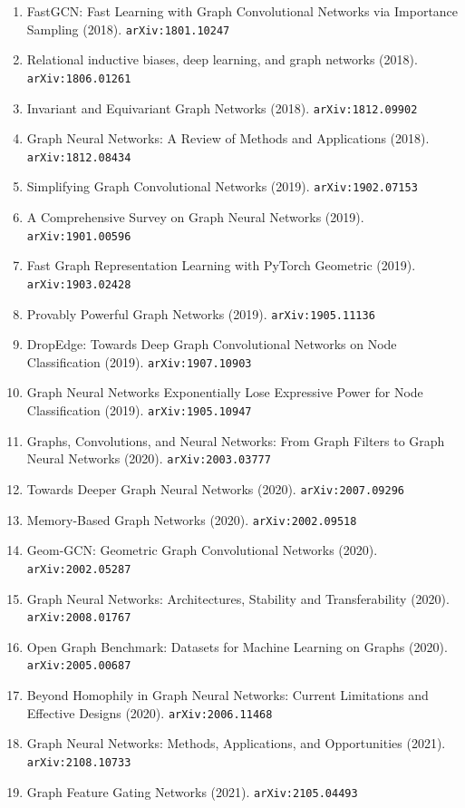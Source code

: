 \documentclass[11pt]{article}
\begin{document}
\begin{enumerate}
  \item FastGCN: Fast Learning with Graph Convolutional Networks via Importance
  Sampling (2018). \texttt{arXiv:1801.10247}
  \item Relational inductive biases, deep learning, and graph networks (2018). \texttt{arXiv:1806.01261}
  \item Invariant and Equivariant Graph Networks (2018). \texttt{arXiv:1812.09902}
  \item Graph Neural Networks: A Review of Methods and Applications (2018). \texttt{arXiv:1812.08434}
  \item Simplifying Graph Convolutional Networks (2019). \texttt{arXiv:1902.07153}
  \item A Comprehensive Survey on Graph Neural Networks (2019). \texttt{arXiv:1901.00596}
  \item Fast Graph Representation Learning with PyTorch Geometric (2019). \texttt{arXiv:1903.02428}
  \item Provably Powerful Graph Networks (2019). \texttt{arXiv:1905.11136}
  \item DropEdge: Towards Deep Graph Convolutional Networks on Node
  Classification (2019). \texttt{arXiv:1907.10903}
  \item Graph Neural Networks Exponentially Lose Expressive Power for Node
  Classification (2019). \texttt{arXiv:1905.10947}
  \item Graphs, Convolutions, and Neural Networks: From Graph Filters to Graph
  Neural Networks (2020). \texttt{arXiv:2003.03777}
  \item Towards Deeper Graph Neural Networks (2020). \texttt{arXiv:2007.09296}
  \item Memory-Based Graph Networks (2020). \texttt{arXiv:2002.09518}
  \item Geom-GCN: Geometric Graph Convolutional Networks (2020). \texttt{arXiv:2002.05287}
  \item Graph Neural Networks: Architectures, Stability and Transferability (2020). \texttt{arXiv:2008.01767}
  \item Open Graph Benchmark: Datasets for Machine Learning on Graphs (2020). \texttt{arXiv:2005.00687}
  \item Beyond Homophily in Graph Neural Networks: Current Limitations and
  Effective Designs (2020). \texttt{arXiv:2006.11468}
  \item Graph Neural Networks: Methods, Applications, and Opportunities (2021). \texttt{arXiv:2108.10733}
  \item Graph Feature Gating Networks (2021). \texttt{arXiv:2105.04493}

\end{enumerate}
\end{document}
